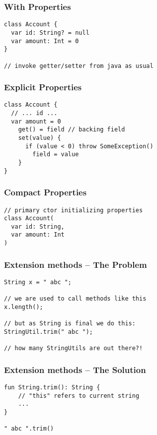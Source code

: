 \begin{frame}[fragile] \frametitle{With Properties}
\begin{lstlisting}
class Account {
  var id: String? = null
  var amount: Int = 0
}

// invoke getter/setter from java as usual
\end{lstlisting}
\end{frame}

\begin{frame}[fragile] \frametitle{Explicit Properties}
\begin{lstlisting}
class Account {
  // ... id ...
  var amount = 0
    get() = field // backing field
    set(value) {
      if (value < 0) throw SomeException()
        field = value
    }
}
\end{lstlisting}
\end{frame}

\begin{frame}[fragile] \frametitle{Compact Properties}
\begin{lstlisting}
// primary ctor initializing properties
class Account(
  var id: String,
  var amount: Int
)
\end{lstlisting}
\end{frame}


\begin{frame}[fragile] \frametitle{Extension methods -- The Problem}
\begin{lstlisting}
String x = " abc ";

// we are used to call methods like this
x.length();

// but as String is final we do this:
StringUtil.trim(" abc ");

// how many StringUtils are out there?!
\end{lstlisting}
\end{frame}

\begin{frame}[fragile] \frametitle{Extension methods -- The Solution}
\begin{lstlisting}
fun String.trim(): String {
    // "this" refers to current string
    ...
}

" abc ".trim()
\end{lstlisting}
\end{frame}





